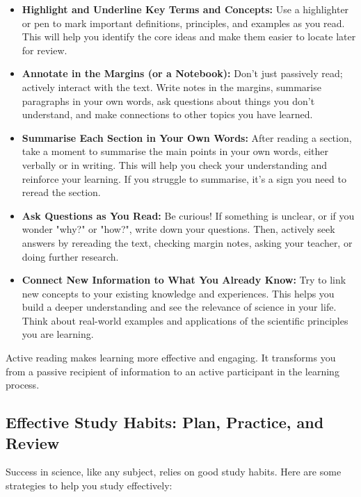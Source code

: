 \begin{itemize}
    \item \textbf{Highlight and Underline Key Terms and Concepts:}  Use a highlighter or pen to mark important definitions, principles, and examples as you read.  This will help you identify the core ideas and make them easier to locate later for review.
    \item \textbf{Annotate in the Margins (or a Notebook):}  Don't just passively read; actively interact with the text.  Write notes in the margins, summarise paragraphs in your own words, ask questions about things you don't understand, and make connections to other topics you have learned.
    \item \textbf{Summarise Each Section in Your Own Words:}  After reading a section, take a moment to summarise the main points in your own words, either verbally or in writing.  This will help you check your understanding and reinforce your learning.  If you struggle to summarise, it's a sign you need to reread the section.
    \item \textbf{Ask Questions as You Read:}  Be curious!  If something is unclear, or if you wonder "why?" or "how?", write down your questions.  Then, actively seek answers by rereading the text, checking margin notes, asking your teacher, or doing further research.
    \item \textbf{Connect New Information to What You Already Know:}  Try to link new concepts to your existing knowledge and experiences.  This helps you build a deeper understanding and see the relevance of science in your life.  Think about real-world examples and applications of the scientific principles you are learning.
\end{itemize}

Active reading makes learning more effective and engaging. It transforms you from a passive recipient of information to an active participant in the learning process.

\FloatBarrier

\subsection{Effective Study Habits: Plan, Practice, and Review}

Success in science, like any subject, relies on good study habits.  Here are some strategies to help you study effectively:

